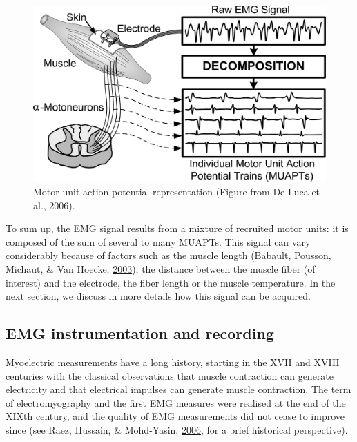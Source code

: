 \documentclass[a4paper,12pt,twoside,openright,oldfontcommands]{memoir}
\begin{document}
\begin{figure}[H]

{\centering \includegraphics[width=0.75\linewidth]{assets/muap} 

}

\caption{Motor unit action potential representation (Figure from De Luca et al., 2006).}\label{fig:muap}
\end{figure}

To sum up, the EMG signal results from a mixture of recruited motor units: it is composed of the sum of several to many MUAPTs. This signal can vary considerably because of factors such as the muscle length (Babault, Pousson, Michaut, \& Van Hoecke, \protect\hyperlink{ref-babault_effect_2003}{2003}), the distance between the muscle fiber (of interest) and the electrode, the fiber length or the muscle temperature. In the next section, we discuss in more details how this signal can be acquired.

\hypertarget{emg-instrumentation-and-recording}{%
\subsection{EMG instrumentation and recording}\label{emg-instrumentation-and-recording}}

Myoelectric measurements have a long history, starting in the XVII and XVIII centuries with the classical observations that muscle contraction can generate electricity and that electrical impulses can generate muscle contraction. The term of electromyography and the first EMG measures were realised at the end of the XIXth century, and the quality of EMG measurements did not cease to improve since (see Raez, Hussain, \& Mohd-Yasin, \protect\hyperlink{ref-raez_techniques_2006}{2006}, for a brief historical perspective).
\end{document}
